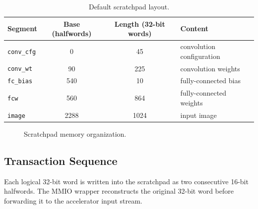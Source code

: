 \begin{table}[h]
\centering
\small
\begin{tabular}{|l|c|c|l|}
\hline
\textbf{Segment} & \textbf{Base (halfwords)} & \textbf{Length (32-bit words)} & \textbf{Content} \\
\hline
\texttt{conv\_cfg} & 0 & 45 & convolution configuration \\
\hline
\texttt{conv\_wt} & 90 & 225 & convolution weights \\
\hline
\texttt{fc\_bias} & 540 & 10 & fully-connected bias \\
\hline
\texttt{fcw} & 560 & 864 & fully-connected weights \\
\hline
\texttt{image} & 2288 & 1024 & input image \\
\hline
\end{tabular}
\caption{Default scratchpad layout.}
\label{tab:mmio-scratchpad}
\end{table}

\begin{figure}[h]
\centering
{}
\caption{Scratchpad memory organization.}
\label{fig:mmio-address-layout}
\end{figure}

\subsection{Transaction Sequence}

Each logical 32-bit word is written into the scratchpad as two consecutive
16-bit halfwords. The MMIO wrapper reconstructs the original 32-bit word before
forwarding it to the accelerator input stream.

